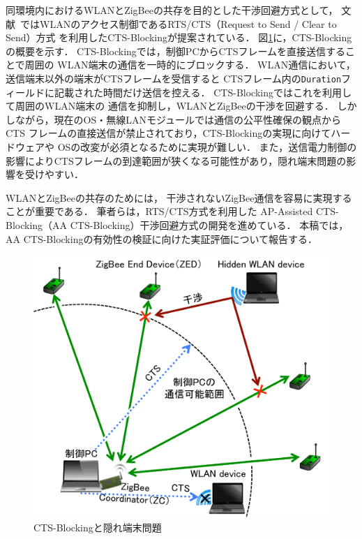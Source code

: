 \documentclass[technicalreport]{ieicej}
\begin{document}
同環境内におけるWLANとZigBeeの共存を目的とした干渉回避方式として，
文献~\cite{Hou09:}ではWLANのアクセス制御であるRTS/CTS（Request to Send / Clear to Send）方式
を利用したCTS-Blockingが提案されている．
図\ref{fig:cts_blocking}に，CTS-Blockingの概要を示す．
CTS-Blockingでは，制御PCからCTSフレームを直接送信することで周囲の
WLAN端末の通信を一時的にブロックする．
WLAN通信において，送信端末以外の端末がCTSフレームを受信すると
CTSフレーム内の\texttt{Duration}フィールドに記載された時間だけ送信を控える．
CTS-Blockingではこれを利用して周囲のWLAN端末の
通信を抑制し，WLANとZigBeeの干渉を回避する．
しかしながら，現在のOS・無線LANモジュールでは通信の公平性確保の観点からCTS
フレームの直接送信が禁止されており，CTS-Blockingの実現に向けてハードウェアや
OSの改変が必須となるために実現が難しい．
また，送信電力制御の影響によりCTSフレームの到達範囲が狭くなる可能性があり，隠れ端末問題の影響を受けやすい．

WLANとZigBeeの共存のためには，%
干渉されないZigBee通信を容易に実現することが重要である．
筆者らは，RTS/CTS方式を利用した
AP-Assisted CTS-Blocking（AA CTS-Blocking）干渉回避方式の開発を進めている．
本稿では，AA CTS-Blockingの有効性の検証に向けた実証評価について報告する．

\begin{figure}[bt]
 \centering
 \includegraphics[width=\columnwidth]{figure/cts_blocking.pdf}
 \caption{CTS-Blockingと隠れ端末問題}
 \label{fig:cts_blocking}
\end{figure}
\end{document}

